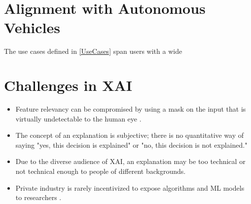\documentclass{IEEEtran}
\begin{document}
\section{Alignment with Autonomous Vehicles}

The use cases defined in \ref{UseCases} span users with a wide

\section{Challenges in XAI}
\begin{itemize}
    \item Feature relevancy can be compromised by using a mask on the input that is virtually undetectable to the human eye \cite{DBLP:journals/corr/abs-1812-00891}.

    \item The concept of an explanation is subjective; there is no quantitative way of saying "yes, this decision is explained" or "no, this decision is not explained." \cite{Bibal2016}

    \item Due to the diverse audience of XAI, an explanation may be too technical or not technical enough to people of different backgrounds.
    
    \item Private industry is rarely incentivized to expose algorithms and ML models to researchers \cite{Veale:2018:FAD:3173574.3174014}.
\end{itemize}

\nocite{*}

 
\end{document}
